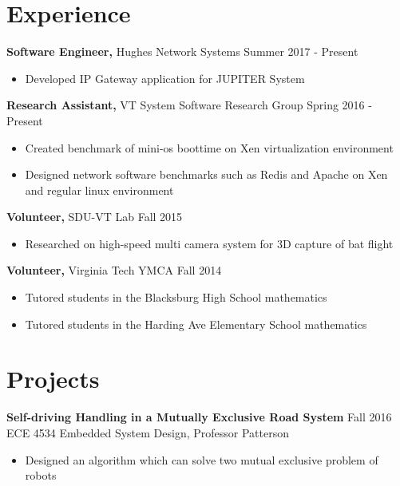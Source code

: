 \documentclass[margin]{res}
\begin{document}
\begin{resume}
  
\section{Experience} %

 {\bf Software Engineer,} Hughes Network Systems \hfill Summer 2017 - Present
 \begin{itemize} \itemsep -2pt  %
 \item Developed IP Gateway application for JUPITER System
 \end{itemize}

 {\bf Research Assistant,} VT System Software Research Group \hfill Spring 2016 - Present
 \begin{itemize} \itemsep -2pt  %
 \item Created benchmark of mini-os boottime on Xen virtualization environment
 \item Designed network software benchmarks such as Redis and Apache on Xen and 
 	regular linux environment
 \end{itemize}

{\bf Volunteer,} SDU-VT Lab \hfill  Fall 2015
\begin{itemize} \itemsep -2pt %
\item Researched on high-speed multi camera system for 3D capture of bat flight
\end{itemize}

{\bf Volunteer,} Virginia Tech YMCA  \hfill
Fall 2014                
                \begin{itemize} \itemsep -2pt
                 \item  Tutored students in the Blacksburg High School mathematics
                
                 \item Tutored students in the Harding Ave Elementary School mathematics

		 \end{itemize}


\section{Projects} 
               {\bf Self-driving Handling in a Mutually Exclusive Road System}     \hfill         Fall 2016  \\           
                {ECE 4534 Embedded System Design, Professor Patterson} 
                 \begin{itemize} \itemsep -2pt
                 \item Designed an algorithm which can solve two mutual exclusive problem of robots
                 

\end{itemize}
\end{resume}
\end{document}
